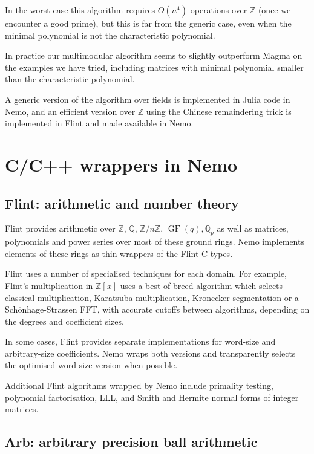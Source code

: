 \documentclass{sig-alternate-05-2015}
\begin{document}
In the worst case this algorithm requires $O(n^4)$ operations over $\mathbb{Z}$
(once we encounter a good prime), but this is far from the generic case, even when
the minimal polynomial is not the characteristic polynomial.

In practice our multimodular algorithm seems to slightly outperform Magma on the
examples we have tried, including matrices with minimal polynomial smaller 
than the characteristic polynomial.

A generic version of the algorithm over fields is implemented in Julia code in
Nemo, and an efficient version over $\mathbb{Z}$ using the Chinese remaindering
trick is implemented in Flint and made available in Nemo.

\section{C/C++ wrappers in Nemo}
\label{sect:wrappers}

\subsection{Flint: arithmetic and number theory}

Flint provides arithmetic over
$\mathbb{Z}$, $\mathbb{Q}$, $\mathbb{Z}/n\mathbb{Z}$,
$\operatorname{GF}(q), \mathbb{Q}_p$
as well as matrices, polynomials and power series over most
of these ground rings.
Nemo implements elements of these rings as thin wrappers of the
Flint C types.

Flint uses a number of specialised techniques for each domain.
For example, Flint's multiplication in $\mathbb{Z}[x]$
uses a best-of-breed algorithm which selects classical multiplication,
Karatsuba multiplication, Kronecker segmentation or a 
Sch\"{o}nhage-Strassen FFT, with accurate cutoffs
between algorithms, depending on the degrees and coefficient sizes.

In some cases, Flint provides separate implementations
for word-size and arbitrary-size coefficients.
Nemo wraps both versions and transparently selects the
optimised word-size version when possible.

Additional Flint algorithms wrapped by Nemo include
primality testing, polynomial factorisation, LLL, and Smith and Hermite
normal forms of integer matrices.

\subsection{Arb: arbitrary precision ball arithmetic}
\end{document}
